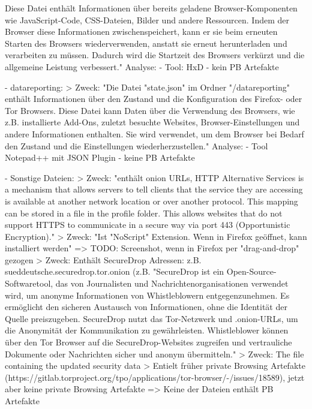 		Diese Datei enthält Informationen über bereits geladene Browser-Komponenten wie JavaScript-Code, CSS-Dateien, Bilder und andere Ressourcen. Indem der Browser diese Informationen zwischenspeichert, kann er sie beim erneuten Starten des Browsers wiederverwenden, anstatt sie erneut herunterladen und verarbeiten zu müssen. Dadurch wird die Startzeit des Browsers verkürzt und die allgemeine Leistung verbessert." %
	Analyse:
		- Tool: HxD
		- kein PB Artefakte

- datareporting:
	> %
	Zweck: 
		"Die Datei "state.json" im Ordner "/datareporting" enthält Informationen über den Zustand und die Konfiguration des Firefox- oder Tor Browsers. Diese Datei kann Daten über die Verwendung des Browsers, wie z.B. installierte Add-Ons, zuletzt besuchte Websites, Browser-Einstellungen und andere Informationen enthalten. Sie wird verwendet, um dem Browser bei Bedarf den Zustand und die Einstellungen wiederherzustellen."
	Analyse:
		- Tool Notepad++ mit JSON Plugin
		- keine PB Artefakte

- Sonstige Dateien:
	> %
		Zweck:
			"enthält onion URLs,
			HTTP Alternative Services is a mechanism that allows servers to tell clients that the service they are accessing is available at another network location or over another protocol.
			This mapping can be stored in a file in the profile folder. This allows websites that do not support HTTPS to communicate in a secure way via port 443 (Opportunistic Encryption)."
	> %
		Zweck:
			"Ist "NoScript" Extension. Wenn in Firefox geöffnet, kann installiert werden"
		=> TODO: Screenshot, wenn in Firefox per "drag-and-drop" gezogen
	> %
		Zweck:
			Enthält SecureDrop Adressen: z.B. sueddeutsche.securedrop.tor.onion (z.B. %
				"SecureDrop ist ein Open-Source-Softwaretool, das von Journalisten und Nachrichtenorganisationen verwendet wird, um anonyme Informationen von Whistleblowern entgegenzunehmen. Es ermöglicht den sicheren Austausch von Informationen, ohne die Identität der Quelle preiszugeben. SecureDrop nutzt das Tor-Netzwerk und .onion-URLs, um die Anonymität der Kommunikation zu gewährleisten. Whistleblower können über den Tor Browser auf die SecureDrop-Websites zugreifen und vertrauliche Dokumente oder Nachrichten sicher und anonym übermitteln."
	> %
		Zweck: The file containing the updated security data %
	> %
		Entielt früher private Browsing Artefakte (https://gitlab.torproject.org/tpo/applications/tor-browser/-/issues/18589), jetzt aber keine private Browsing Artefakte
	=> Keine der Dateien enthält PB Artefakte
				
